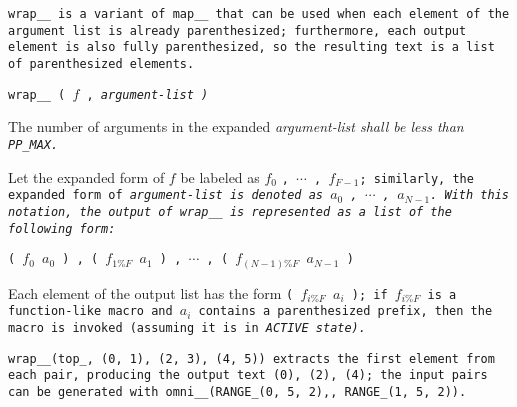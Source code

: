 \tt{wrap__} is a variant of \tt{map__} that can be used when
each element of the argument list is already parenthesized;
furthermore, each output element is also fully parenthesized,
so the resulting text is a list of parenthesized elements.


\tt{wrap__ (} $f$ \tt{,} \it{argument-list} \tt{)}


The number of arguments in the expanded
\it{argument-list} shall be less than \tt{PP_MAX}.


Let the expanded form of $f$ be labeled as $f_0$ \tt{,} $\cdots$ \tt{,} $f_{F-1}$;
similarly, the expanded form of \it{argument-list}
is denoted as $a_0$ \tt{,} $\cdots$ \tt{,} $a_{N-1}$.
With this notation, the output of \tt{wrap__}
is represented as a list of the following form:

\centerline
{
\tt{(} $f_0$ $a_0$ \tt{) ,}
\tt{(} $f_{1\%F}$ $a_1$ \tt{) ,}
$\cdots$ \tt{,}
\tt{(} $f_{(N - 1)\%F}$ $a_{N - 1}$ \tt{)}
}

Each element of the output list has the form \tt{(} $f_{i\%F}$ $a_i$ \tt{)};
if $f_{i\%F}$ is a function-like macro and $a_i$ contains a parenthesized prefix,
then the macro is invoked (assuming it is in \it{\tt{ACTIVE}} state).

\example \tt{wrap__(top_, (0, 1), (2, 3), (4, 5))} extracts the first element
from each pair, producing the output text \tt{(0), (2), (4)}; the input pairs
can be generated with \tt{omni__(RANGE_(0, 5, 2),, RANGE_(1, 5, 2))}.
